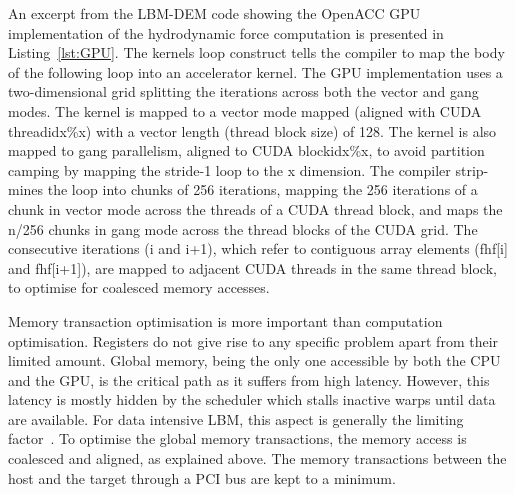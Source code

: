 An excerpt from the LBM-DEM code showing the OpenACC GPU implementation of the 
hydrodynamic force computation is presented in Listing~\ref{lst:GPU}. The 
kernels loop construct tells the compiler to map the body of the following loop 
into an accelerator kernel. The GPU implementation uses a two-dimensional grid 
splitting the iterations across both the vector and gang modes. The kernel is 
mapped to a vector mode mapped (aligned with CUDA threadidx\%x) with a vector 
length (thread block size) of 128. The kernel is also mapped to gang 
parallelism, aligned to CUDA blockidx\%x, to avoid partition camping by mapping 
the stride-1 loop to the x dimension. The compiler strip-mines the loop into 
chunks of 256 iterations, mapping the 256 iterations of a chunk in vector mode 
across the threads of a CUDA thread block, and maps the n/256 chunks in gang 
mode across the thread blocks of the CUDA grid. The consecutive iterations (i 
and i+1), which refer to contiguous array elements (fhf[i] and fhf[i+1]), are 
mapped to adjacent CUDA threads in the same thread block, to optimise for 
coalesced memory accesses. 

Memory transaction optimisation is more important than computation
optimisation. Registers do not give rise to any specific problem apart from 
their limited amount. Global memory, being the only one accessible by both the 
CPU and the GPU, is the critical path as it suffers from high latency. However, 
this latency is mostly hidden by the scheduler which stalls inactive warps 
until data are available. For data intensive LBM, this aspect is generally the 
limiting factor~\citep{Obrecht2011}. To optimise the global memory 
transactions, the memory access is coalesced and aligned, as explained above. 
The memory transactions between the host and the target through a PCI bus are 
kept to a minimum.

\clearpage

